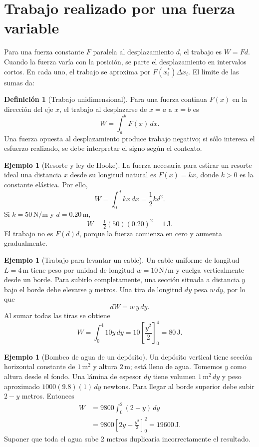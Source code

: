 \documentclass[12pt]{article}
\theoremstyle{definition}
\newtheorem{definicion}[teorema]{Definición}
\newtheorem{ejemplo}[teorema]{Ejemplo}
\theoremstyle{remark}
\newcommand{\dd}{\,dx}
\begin{document}
\section{Trabajo realizado por una fuerza variable}
Para una fuerza constante $F$ paralela al desplazamiento $d$, el trabajo es $W=Fd$. Cuando la fuerza varía con la posición, se parte el desplazamiento en intervalos cortos. En cada uno, el trabajo se aproxima por $F(x_i^*)\Delta x_i$. El límite de las sumas da:
\begin{definicion}[Trabajo unidimensional]
Para una fuerza continua $F(x)$ en la dirección del eje $x$, el trabajo al desplazarse de $x=a$ a $x=b$ es
\[\boxed{W=\int_a^b F(x)\dd.}\]
Una fuerza opuesta al desplazamiento produce trabajo negativo; si sólo interesa el esfuerzo realizado, se debe interpretar el signo según el contexto.
\end{definicion}
\begin{ejemplo}[Resorte y ley de Hooke]
La fuerza necesaria para estirar un resorte ideal una distancia $x$ desde su longitud natural es $F(x)=kx$, donde $k>0$ es la constante elástica. Por ello,
\[W=\int_0^d kx\dd=\boxed{\frac12kd^2}.\]
Si $k=50\,\mathrm{N/m}$ y $d=0.20\,\mathrm m$,
\[W=\tfrac12(50)(0.20)^2=\boxed{1\,\mathrm J}.\]
El trabajo no es $F(d)d$, porque la fuerza comienza en cero y aumenta gradualmente.
\end{ejemplo}
\begin{ejemplo}[Trabajo para levantar un cable]
Un cable uniforme de longitud $L=4\,\mathrm m$ tiene peso por unidad de longitud $w=10\,\mathrm{N/m}$ y cuelga verticalmente desde un borde. Para subirlo completamente, una sección situada a distancia $y$ bajo el borde debe elevarse $y$ metros. Una tira de longitud $dy$ pesa $w\,dy$, por lo que
\[dW=w\,y\,dy.\]
Al sumar todas las tiras se obtiene
\[W=\int_0^4 10y\,dy=10\left[\frac{y^2}{2}\right]_0^4
=\boxed{80\,\mathrm J}.\]
\end{ejemplo}
\begin{ejemplo}[Bombeo de agua de un depósito]
Un depósito vertical tiene sección horizontal constante de $1\,\mathrm{m}^2$ y altura $2\,\mathrm m$; está lleno de agua. Tomemos $y$ como altura desde el fondo. Una lámina de espesor $dy$ tiene volumen $1\,\mathrm{m}^2\,dy$ y peso aproximado $1000(9.8)(1)\,dy$ newtons. Para llegar al borde superior debe subir $2-y$ metros. Entonces
\begin{align*}
W&=9800\int_0^2(2-y)\,dy\\
&=9800\left[2y-\frac{y^2}{2}\right]_0^2
=\boxed{19600\,\mathrm J}.
\end{align*}
Suponer que toda el agua sube $2$ metros duplicaría incorrectamente el resultado.
\end{ejemplo}
\end{document}
